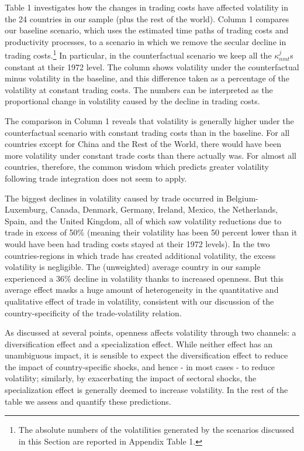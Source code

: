 \documentclass[12pt]{article}
\begin{document}
Table 1 investigates how the changes in trading costs have affected
volatility in the 24 countries in our sample (plus the rest of the world).
Column 1 compares our baseline scenario, which uses the estimated time paths
of trading costs and productivity processes, to a scenario in which we
remove the secular decline in trading costs.\footnote{%
The absolute numbers of the volatilities generated by the scenarios
discussed in this Section are reported in Appendix Table 1.} In particular,
in the counterfactual scenario we keep all the $\kappa _{nmt}^{j}$s constant
at their 1972 level. The column shows volatility under the counterfactual
minus volatility in the baseline, and this difference taken as a percentage
of the volatility at constant trading costs. The numbers can be interpreted
as the proportional change in volatility caused by the decline in trading
costs.

The comparison in Column 1 reveals that volatility is generally higher under
the counterfactual scenario with constant trading costs than in the
baseline. For all countries except for China and the Rest of the World, there would have been more
volatility under constant trade costs than there actually was. For almost all
countries, therefore, the common wisdom which predicts greater volatility
following trade integration does not seem to apply.

The biggest declines in volatility caused by trade occurred in
Belgium-Luxemburg, Canada, Denmark, Germany, Ireland, Mexico, the
Netherlands, Spain, and the United Kingdom, all of which saw volatility
reductions due to trade in excess of 50\% (meaning their volatility has been
50 percent lower than it would have been had trading costs stayed at their
1972 levels). In the two countries-regions in which trade has created additional
volatility, the excess volatility is negligible. The (unweighted) average
country in our sample experienced a 36\% decline in volatility thanks to
increased openness. But this average effect masks a huge amount of
heterogeneity in the quantitative and qualitative effect of trade in
volatility, consistent with our discussion of the country-specificity of the
trade-volatility relation.

As discussed at several points, openness affects volatility through two
channels: a diversification effect and a specialization effect. While
neither effect has an unambiguous impact, it is sensible to expect the
diversification effect to reduce the impact of country-specific shocks, and
hence - in most cases - to reduce volatility; similarly, by exacerbating the
impact of sectoral shocks, the specialization effect is generally deemed to
increase volatility. In the rest of the table we assess and quantify these
predictions.
\end{document}

